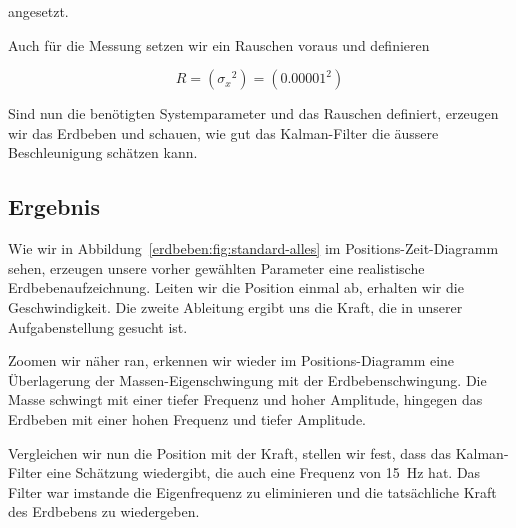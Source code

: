 angesetzt.

Auch für die Messung setzen wir ein Rauschen voraus und definieren

\begin{equation}
R= ({\sigma_x}^2)=
({0.00001}^2)
\end{equation}

Sind nun die benötigten Systemparameter und das Rauschen definiert, erzeugen wir das Erdbeben und schauen, wie gut das Kalman-Filter die äussere Beschleunigung schätzen kann.

\subsection*{Ergebnis}

Wie wir in Abbildung~\ref{erdbeben:fig:standard-alles} im Positions-Zeit-Diagramm sehen, erzeugen unsere vorher gewählten Parameter eine realistische Erdbebenaufzeichnung.
Leiten wir die Position einmal ab, erhalten wir die Geschwindigkeit.
Die zweite Ableitung ergibt uns die Kraft, die in unserer Aufgabenstellung gesucht ist.

Zoomen wir näher ran, erkennen wir wieder im Positions-Diagramm eine Überlagerung der Massen-Eigenschwingung mit der Erdbebenschwingung.
Die Masse schwingt mit einer tiefer Frequenz und hoher Amplitude, hingegen das Erdbeben mit einer hohen Frequenz und tiefer Amplitude.

Vergleichen wir nun die Position mit der Kraft, stellen wir fest, dass das Kalman-Filter eine Schätzung wiedergibt, die auch eine Frequenz von \SI{15}{\hertz} hat.
Das Filter war imstande die Eigenfrequenz zu eliminieren und die tatsächliche Kraft des Erdbebens zu wiedergeben.

